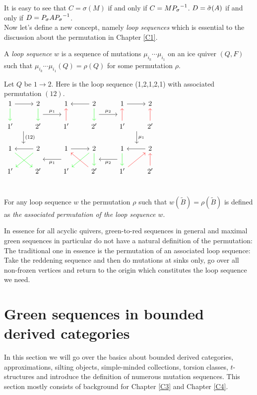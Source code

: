 \indent It is easy to see that $C=\sigma(M)$ if and only if $C=M{P_{\sigma}}^{-1}$. $D=\tilde{\sigma}(A)$ if and only if $D=P_{\sigma} A{P_{\sigma}}^{-1}$.\\
\indent Now let's define a new concept, namely \textit{loop sequences} which is essential to the discussion about the permutation in Chapter \ref{C1}.\\
\begin{definition} 
A \textit{loop sequence} $w$ is a sequence of mutations $\mu_{i_k}\cdots\mu_{i_1}$ on an ice quiver $(Q,F)$ such that $\mu_{i_k}\cdots\mu_{i_1}(Q) = \rho(Q)$ for some permutation $\rho$.\\
\end{definition}
\begin{example}
\indent Let $Q$ be $1\to 2$. Here is the loop sequence (1,2,1,2,1) with associated permutation $(12)$.\\
$\begin{tikzcd}
1 \arrow[r] \arrow[d,green] & 2\arrow [d,green]\arrow[r,"\mu_1", shift right=3.5ex]  & 1&2\arrow[l]\arrow[d,green]\arrow[r,"\mu_2", shift right=3.5ex]&1\arrow[r] & 2\\
1' \arrow[d,"(12)", shift left=4.5ex]& 2'&1'\arrow[u,red]& 2'&1'\arrow[u,red] & 2'\arrow[u,red]\arrow[d,"\mu_1", shift right=4.5ex]\\
 1\arrow[dr,green]&2\arrow[l]\arrow[dl,green]&1\arrow[r]\arrow[l,"\mu_1", shift left=3.5ex]&2\arrow[dl,green]\arrow[d,green]&1\arrow[l,"\mu_2", shift left=3.5ex]\arrow[d,green]&2\arrow[l]\\
 1'&2'&1'&2'\arrow[ul,red]&1'\arrow[ur,red]&2'\arrow[u,red]\\
\end{tikzcd}$
\end{example}
\begin{definition}
For any loop sequence $w$ the permutation $\rho$ such that $w(\tilde{B})=\rho(\tilde{B})$ is defined as \textit{the associated permutation of the loop sequence $w$}.\\
\end{definition}
\indent In essence for all acyclic quivers, green-to-red sequences in general and maximal green sequences in particular do not have a natural definition of the permutation: The traditional one in essence is the permutation of an associated loop sequence: Take the reddening sequence and then do mutations at sinks only, go over all non-frozen vertices and return to the origin which constitutes the loop sequence we need.\\
\section{Green sequences in bounded derived categories}
\indent In this section we will go over the basics about bounded derived categories, approximations, silting objects, simple-minded collections, torsion classes, $t$-structures and introduce the definition of numerous mutation sequences. This section mostly consists of background for Chapter \ref{C3} and Chapter \ref{C4}.\\
